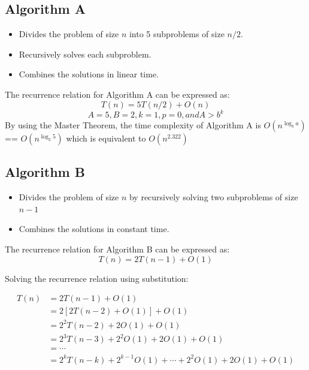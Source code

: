 \documentclass{article}
\begin{document}
\subsection*{Algorithm A}
\begin{itemize}
    \item Divides the problem of size \( n \) into 5 subproblems of size \( n/2 \).
    \item Recursively solves each subproblem.
    \item Combines the solutions in linear time.
\end{itemize}

The recurrence relation for Algorithm A can be expressed as:
\[
    T(n) = 5T(n/2) + O(n)
\]
\[ A = 5, B = 2, k = 1, p = 0, and A > b^{k}\]
By using the Master Theorem, the time complexity of Algorithm A is \( O(n^{\log_b{a}}) \) == \( O(n^{\log_2{5}}) \) which is equivalent to
\( O(n^{2.322}) \)

\subsection*{Algorithm B}
\begin{itemize}
    \item Divides the problem of size \( n \) by recursively solving two subproblems of size \( n - 1 \)
    \item Combines the solutions in constant time.
\end{itemize}

The recurrence relation for Algorithm B can be expressed as:
\[ T(n) = 2T(n-1) + O(1) \]

Solving the recurrence relation using substitution:

\[
    \begin{aligned}
        T(n) & = 2T(n-1) + O(1)                                               \\
             & = 2[2T(n-2) + O(1)] + O(1)                                     \\
             & = 2^2 T(n-2) + 2O(1) + O(1)                                    \\
             & = 2^3 T(n-3) + 2^2 O(1) + 2O(1) + O(1)                         \\
             & = \cdots                                                       \\
             & = 2^k T(n-k) + 2^{k-1} O(1) + \cdots + 2^2 O(1) + 2O(1) + O(1)
    \end{aligned}
\]
\end{document}
